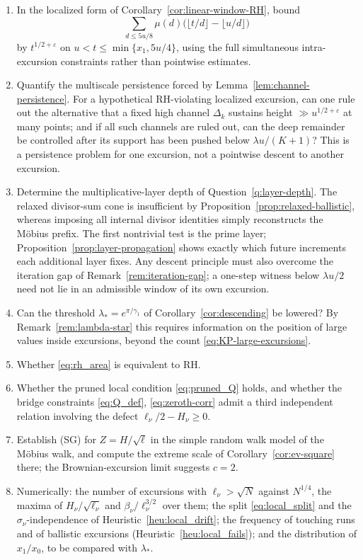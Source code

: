 \documentclass[11pt]{amsart}
\numberwithin{equation}{section}
\theoremstyle{plain}
\theoremstyle{definition}
\theoremstyle{remark}
\newcommand{\eps}{\varepsilon}
\begin{document}
\begin{enumerate}[label=\textup{(\arabic*)}]
\item In the localized form of Corollary~\ref{cor:linear-window-RH}, bound
\[
\sum_{d\le5u/8}\mu(d)
\bigl(\lfloor t/d\rfloor-\lfloor u/d\rfloor\bigr)
\]
by $t^{1/2+\eps}$ on
$u<t\le\min\{x_1,5u/4\}$, using the full simultaneous intra-excursion
constraints rather than pointwise estimates.
\item Quantify the multiscale persistence forced by
Lemma~\ref{lem:channel-persistence}.  For a hypothetical RH-violating
localized excursion, can one rule out the alternative that a fixed high
channel $\Delta_k$ sustains height $\gg u^{1/2+\eps}$ at many points; and if
all such channels are ruled out, can the deep remainder be controlled after
its support has been pushed below $\lambda u/(K+1)$?  This is a persistence
problem for one excursion, not a pointwise descent to another excursion.
\item Determine the multiplicative-layer depth of
Question~\ref{q:layer-depth}.  The relaxed divisor-sum cone is insufficient
by Proposition~\ref{prop:relaxed-ballistic}, whereas imposing all internal
divisor identities simply reconstructs the M\"obius prefix.  The first
nontrivial test is the prime layer; Proposition~\ref{prop:layer-propagation}
shows exactly which future increments each additional layer fixes.  Any
descent principle must also overcome the iteration gap of
Remark~\ref{rem:iteration-gap}; a one-step witness below $\lambda u/2$ need
not lie in an admissible window of its own excursion.
\item Can the threshold $\lambda_*=e^{\pi/\gamma_1}$ of
Corollary~\ref{cor:descending} be lowered? By
Remark~\ref{rem:lambda-star} this requires information on the position of
large values inside excursions, beyond the count
\eqref{eq:KP-large-excursions}.
\item Whether \eqref{eq:rh_area} is equivalent to RH.
\item Whether the pruned local condition \eqref{eq:pruned_Q} holds, and
whether the bridge constraints \eqref{eq:Q_def}, \eqref{eq:zeroth-corr}
admit a third independent relation involving the defect
$\ell_\nu/2-H_\nu\ge0$.
\item Establish (SG) for $Z=H/\sqrt\ell$ in the simple random walk model of
the M\"obius walk, and compute the extreme scale of
Corollary~\ref{cor:ev-square} there; the Brownian-excursion limit suggests
$c=2$.
\item Numerically: the number of excursions with $\ell_\nu>\sqrt N$ against
$N^{1/4}$, the maxima of $H_\nu/\sqrt{\ell_\nu}$ and $\beta_\nu/\ell_\nu^{3/2}$
over them; the split \eqref{eq:local_split} and the $\sigma_\nu$-independence
of Heuristic~\ref{heu:local_drift}; the frequency of touching runs and of
ballistic excursions (Heuristic~\ref{heu:local_fails}); and the distribution
of $x_1/x_0$, to be compared with $\lambda_*$.
\end{enumerate}
\end{document}
